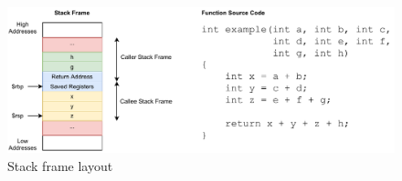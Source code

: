 \begin{figure}[htp!]
\centering
    \includegraphics[width=\textwidth]{assets/figures/chapter2/stack-frame-layout.pdf}
    \caption{Stack frame layout}
    \label{fig:stack-frame-layout}
\end{figure}
